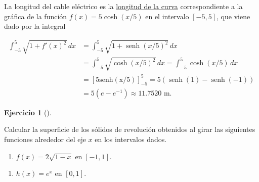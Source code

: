 \documentclass[
  spanish,
  a4paper,
]{scrreport}
\providecommand{\tightlist}{%
  \setlength{\itemsep}{0pt}\setlength{\parskip}{0pt}}
\theoremstyle{definition}
\newtheorem{exercise}{Ejercicio}[chapter]
\theoremstyle{remark}
\begin{document}
\begin{tcolorbox}[enhanced jigsaw, arc=.35mm, bottomrule=.15mm, bottomtitle=1mm, breakable, colback=white, colbacktitle=quarto-callout-tip-color!10!white, colframe=quarto-callout-tip-color-frame, coltitle=black, left=2mm, leftrule=.75mm, opacityback=0, opacitybacktitle=0.6, rightrule=.15mm, title=\textcolor{quarto-callout-tip-color}{\faLightbulb}\hspace{0.5em}{Solución}, titlerule=0mm, toprule=.15mm, toptitle=1mm]

La longitud del cable eléctrico es la
\href{https://aprendeconalf.es/analisis-manual/08-integrales.html\#c\%C3\%A1lculo-de-la-longitud-de-una-curva}{longitud
de la curva} correspondiente a la gráfica de la función
\(f(x)=5\cosh(x/5)\) en el intervalo \([-5,5]\), que viene dado por la
integral

\begin{align*}
\int_{-5}^5 \sqrt{1+f'(x)^2}\,dx
&= \int_{-5}^5 \sqrt{1+\operatorname{senh}(x/5)^2}\,dx\\
&= \int_{-5}^5 \sqrt{\cosh(x/5)^2}\,dx
= \int_{-5}^5 \cosh(x/5)\,dx\\
&= [5\operatorname{senh(x/5)}]_{-5}^5
= 5(\operatorname{senh}(1)-\operatorname{senh}(-1)) \\
&= 5(e-e^{-1}) 
\approx 11.7520 \mbox{ m.}
\end{align*}

\end{tcolorbox}

\begin{exercise}[]\protect\hypertarget{exr-superficie-solido-revolucion}{}\label{exr-superficie-solido-revolucion}

Calcular la superficie de los sólidos de revolución obtenidos al girar
las siguientes funciones alrededor del eje \(x\) en los intervalos
dados.

\begin{enumerate}
\def\labelenumi{\alph{enumi}.}
\tightlist
\item
  \(f(x)=2\sqrt{1-x}\) en \([-1,1]\).
\end{enumerate}

\begin{enumerate}
\def\labelenumi{\alph{enumi}.}
\setcounter{enumi}{2}
\tightlist
\item
  \(h(x)=e^x\) en \([0,1]\).
\end{enumerate}

\end{exercise}
\end{document}

